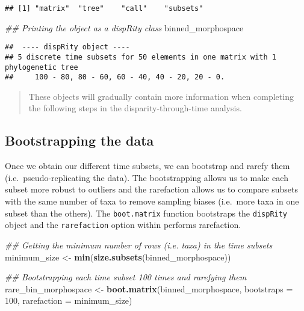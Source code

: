 \documentclass[
]{book}
\newenvironment{Shaded}{\begin{snugshade}}{\end{snugshade}}
\newcommand{\CommentTok}[1]{\textcolor[rgb]{0.56,0.35,0.01}{\textit{#1}}}
\newcommand{\DataTypeTok}[1]{\textcolor[rgb]{0.13,0.29,0.53}{#1}}
\newcommand{\DecValTok}[1]{\textcolor[rgb]{0.00,0.00,0.81}{#1}}
\newcommand{\KeywordTok}[1]{\textcolor[rgb]{0.13,0.29,0.53}{\textbf{#1}}}
\newcommand{\NormalTok}[1]{#1}
\newcommand{\StringTok}[1]{\textcolor[rgb]{0.31,0.60,0.02}{#1}}
\begin{document}
\begin{verbatim}
## [1] "matrix"  "tree"    "call"    "subsets"
\end{verbatim}

\begin{Shaded}
\begin{Highlighting}[]
\CommentTok{\#\# Printing the object as a dispRity class}
\NormalTok{binned\_morphospace}
\end{Highlighting}
\end{Shaded}

\begin{verbatim}
##  ---- dispRity object ---- 
## 5 discrete time subsets for 50 elements in one matrix with 1 phylogenetic tree
##     100 - 80, 80 - 60, 60 - 40, 40 - 20, 20 - 0.
\end{verbatim}

\begin{quote}
These objects will gradually contain more information when completing the following steps in the disparity-through-time analysis.
\end{quote}

\hypertarget{bootstrapping-the-data-1}{%
\subsection{Bootstrapping the data}\label{bootstrapping-the-data-1}}

Once we obtain our different time subsets, we can bootstrap and rarefy them (i.e.~pseudo-replicating the data).
The bootstrapping allows us to make each subset more robust to outliers and the rarefaction allows us to compare subsets with the same number of taxa to remove sampling biases (i.e.~more taxa in one subset than the others).
The \texttt{boot.matrix} function bootstraps the \texttt{dispRity} object and the \texttt{rarefaction} option within performs rarefaction.

\begin{Shaded}
\begin{Highlighting}[]
\CommentTok{\#\# Getting the minimum number of rows (i.e. taxa) in the time subsets}
\NormalTok{minimum\_size \textless{}{-}}\StringTok{ }\KeywordTok{min}\NormalTok{(}\KeywordTok{size.subsets}\NormalTok{(binned\_morphospace))}

\CommentTok{\#\# Bootstrapping each time subset 100 times and rarefying them }
\NormalTok{rare\_bin\_morphospace \textless{}{-}}\StringTok{ }\KeywordTok{boot.matrix}\NormalTok{(binned\_morphospace, }\DataTypeTok{bootstraps =} \DecValTok{100}\NormalTok{,}
    \DataTypeTok{rarefaction =}\NormalTok{ minimum\_size)}
\end{Highlighting}
\end{Shaded}
\end{document}

